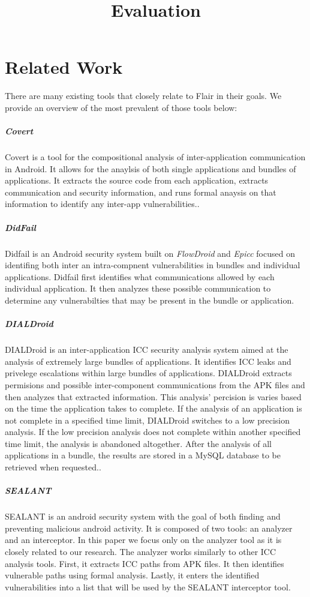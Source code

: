 \documentclass[twocolumn]{article}
\title{Evaluation}
\begin{document}
\section[1]{Related Work}
	There are many existing tools that closely relate to Flair in their goals. We provide an overview of the most prevalent of those tools below:
	\subparagraph{Covert}
		Covert is a tool for the compositional analysis of inter-application communication in Android. It allows for the anaylsis of both single applications and bundles of applications. It extracts the source code from each application, extracts communication and security information, and runs formal anaysis on that information to identify any inter-app vulnerabilities.\cite{Covert}.
	\subparagraph{DidFail}
		Didfail is an Android security system built on \textit{FlowDroid} and \textit{Epicc} focused on identifing both inter an intra-compnent vulnerabilities in bundles and individual applications. Didfail first identifies what communications allowed by each individual application. It then analyzes these possible communication to determine any vulnerabilties that may be present in the bundle or application.\cite{Didfail}
	\subparagraph{DIALDroid}
		DIALDroid is an inter-application ICC security analysis system aimed at the analysis of extremely large bundles of applications. It identifies ICC leaks and privelege escalations within large bundles of applications. DIALDroid extracts permisions and possible inter-component communications from the APK files and then analyzes that extracted information. This analysis' percision is varies based on the time the application takes to complete. If the analysis of an application is not complete in a specified time limit, DIALDroid switches to a low precision analysis. If the low precision analysis does not complete within another specified time limit, the analysis is abandoned altogether. After the analysis of all applications in a bundle, the results are stored in a MySQL database to be retrieved when requested.\cite{DIALDroid}.
	\subparagraph{SEALANT}
		SEALANT is an android security system with the goal of both finding and preventing malicious android activity. It is composed of two tools: an analyzer and an interceptor. In this paper we focus only on the analyzer tool as it is closely related to our research. The analyzer works similarly to other ICC analysis tools. First, it extracts ICC paths from APK files. It then identifies vulnerable paths using formal analysis. Lastly, it enters the identified vulnerabilities into a list that will be used by the SEALANT interceptor tool.
\end{document}
